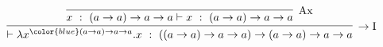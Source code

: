 \documentclass[9pt]{article}
\begin{document}
\[
\infer[\to\text{I}]{\vdash \lambda x^{\color{blue}(a \to a) \to a \to a}.x\ :\ ((a \to a) \to a \to a) \to (a \to a) \to a \to a}{\infer[\text{Ax}]{x\ :\ (a \to a) \to a \to a\vdash x\ :\ (a \to a) \to a \to a}{}}
\]
\end{document}
